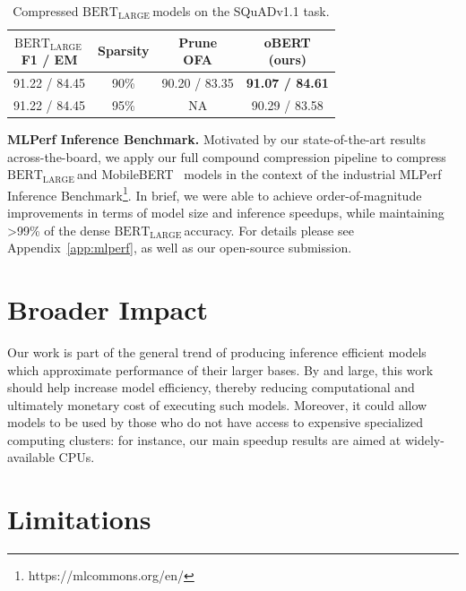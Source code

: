 \documentclass[11pt]{article}
\newcommand{\bertL}{$\textrm{BERT}_{\textrm{LARGE}}\,$}
\begin{document}
\begin{table}[h!]
    \caption{Compressed \bertL models on the SQuADv1.1 task.}
    \label{tab:bertL}
    \centering
    {\small
    \begin{tabular}{cc|cc}
    \toprule 
    \makecell{\bertL\\F1 / EM} & Sparsity & \makecell{Prune\\OFA} & \makecell{oBERT \\(ours)} \\
    \midrule
    91.22 / 84.45 & 90\% & 90.20 / 83.35 & \textbf{91.07 / 84.61}\\
    \midrule
    91.22 / 84.45 & 95\% & NA & 90.29 / 83.58\\
    \bottomrule
    \end{tabular}
    }
\end{table}

\noindent\textbf{MLPerf Inference Benchmark.} Motivated by our state-of-the-art results across-the-board, we apply our full compound compression pipeline to compress \bertL and MobileBERT~\cite{sun2020mobilebert} models in the context of the industrial MLPerf Inference Benchmark\footnote{https://mlcommons.org/en/}. In brief, we were able to achieve order-of-magnitude improvements in terms of model size and inference speedups, while maintaining >99\% of the dense \bertL accuracy. For details please see Appendix~\ref{app:mlperf}, as well as our open-source submission.

\section{Broader Impact}
Our work is part of the general trend of producing inference efficient models which approximate performance of their larger bases. By and large, this work should help increase model efficiency, thereby reducing computational and ultimately monetary cost of executing such models. Moreover, it could allow models to be used by those who do not have access to expensive specialized computing clusters: for instance, our main speedup results are aimed at widely-available CPUs. 

\section{Limitations}
\end{document}
